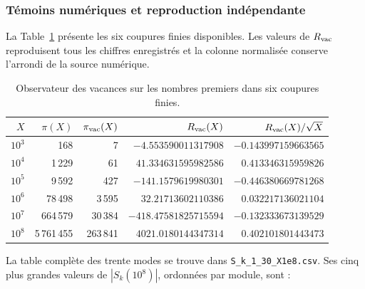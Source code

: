 \subsubsection{Témoins numériques et reproduction indépendante}

La Table~\ref{tab:f051-rvac-powers} présente les six coupures finies
disponibles. Les valeurs de \(R_{\rm vac}\) reproduisent tous les chiffres
enregistrés et la colonne normalisée conserve l’arrondi de la source
numérique.

\begin{table}[htbp]
\centering
\small
\begin{tabular}{rrrrr}
\toprule
\(X\) & \(\pi(X)\) & \(\pi_{\rm vac}(X)\) & \(R_{\rm vac}(X)\)
 & \(R_{\rm vac}(X)/\sqrt X\)\\
\midrule
\(10^3\) & 168 & 7 & \(-4.553590011317908\) & \(-0.143997159663565\)\\
\(10^4\) & 1\,229 & 61 & \(41.334631595982586\) & \(0.413346315959826\)\\
\(10^5\) & 9\,592 & 427 & \(-141.1579619980301\) & \(-0.446380669781268\)\\
\(10^6\) & 78\,498 & 3\,595 & \(32.21713602110386\) & \(0.032217136021104\)\\
\(10^7\) & 664\,579 & 30\,384 & \(-418.47581825715594\) & \(-0.132333673139529\)\\
\(10^8\) & 5\,761\,455 & 263\,841 & \(4021.0180144347314\) & \(0.402101801443473\)\\
\bottomrule
\end{tabular}
\caption{Observateur des vacances sur les nombres premiers dans six coupures finies.}
\label{tab:f051-rvac-powers}
\end{table}

La table complète des trente modes se trouve dans
\texttt{S\_k\_1\_30\_X1e8.csv}. Ses cinq plus grandes valeurs de
\(|S_k(10^8)|\), ordonnées par module, sont :


